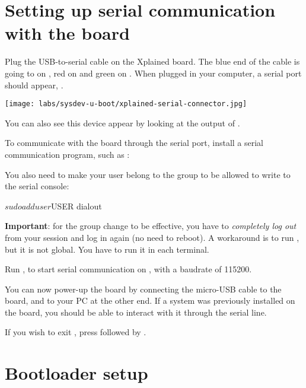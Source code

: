 \section{Setting up serial communication with the board}

Plug the USB-to-serial cable on the Xplained board. The blue end of
the cable is going to  on , red on  and
green on . When plugged in your computer, a serial port
should appear, .

\begin{center}
\texttt{[image: labs/sysdev-u-boot/xplained-serial-connector.jpg]}
\end{center}

You can also see this device appear by looking at the output of
.

To communicate with the board through the serial port, install a
serial communication program, such as :


You also need to make your user belong to the  group to be
allowed to write to the serial console:

\begin{bashinput}
$ sudo adduser $USER dialout
\end{bashinput}

{\bf Important}: for the group change to be effective, you have to
{\em completely log out} from your session and log in again (no need to
reboot). A workaround is to run , but it is not global.
You have to run it in each terminal.

Run , to start serial
communication on , with a baudrate of 115200.

You can now power-up the board by connecting the micro-USB cable to
the board, and to your PC at the other end. If a system was previously
installed on the board, you should be able to interact with it
through the serial line.

If you wish to exit , press \code{[Ctrl][a]} followed by
\code{[Ctrl][x]}.

\section{Bootloader setup}

